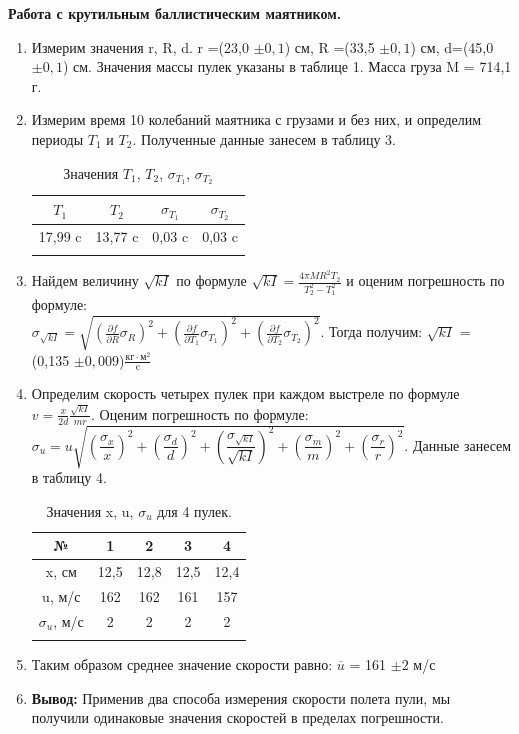 \documentclass[a4paper, 12pt]{article}%
\begin{document}
		\textbf{Работа с крутильным баллистическим маятником.}
		\begin{enumerate}
			
		\item Измерим значения r, R, d. r =(23,0 $\pm 0,1$) см, R =(33,5 $\pm 0,1$) см, d=(45,0 $\pm 0,1$) см. Значения массы пулек указаны в таблице 1. Масса груза M = 714,1 г.
		\item Измерим время 10 колебаний маятника с грузами и без них, и определим периоды $T_1$ и $T_2$. Полученные данные занесем в таблицу 3.
		\begin{longtable}{|c|c|c|c|}
			\hline 
			$T_1$ & $T_2$  & $\sigma_{T_1}$ & $\sigma_{T_2}$ \\
			\hline
			17,99 c&13,77 c& 0,03 c & 0,03 c\\
			\hline
			\caption{Значения $T_1$, $T_2$, $\sigma_{T_1}$, $\sigma_{T_2}$   }
		\end{longtable}
		\item Найдем величину $\sqrt{kI}$ по формуле $\sqrt{kI} = \frac{4 \pi M R^2 T_2}{T_2^2 - T_1^2}$ и оценим погрешность по формуле:\\ $\sigma_{\sqrt{kI}}= \sqrt{(\frac{\partial f}{\partial R}\sigma_R)^2 + (\frac{\partial f}{\partial T_1}\sigma_{T_1})^2 + (\frac{\partial f}{\partial T_2}\sigma_{T_2})^2}$. Тогда получим:
		$\sqrt{kI}$ = (0,135 $\pm0,009$)$\frac {\text {кг}\cdot \text{м}^2}{\text{c}}$
		\item Определим скорость четырех пулек при каждом выстреле по формуле $v = \frac{x}{2d}  \frac{\sqrt{kI}}{mr}$. Оценим погрешность по формуле: $\sigma_u = u\sqrt{\left( \dfrac{\sigma_{x}}{x} \right)^2 + \left( \dfrac{\sigma_{d}}{d} \right)^2 + \left( \dfrac{\sigma_{ \sqrt{kI}}}{\sqrt{kI}} \right)^2 + \left( \dfrac{\sigma_{m}}{m} \right)^2+ \left( \dfrac{\sigma_{r}}{r} \right)^2}$. Данные занесем в таблицу 4.
		
		\begin{longtable}{|c|c|c|c|c|}
			\hline 
			№ & 1 & 2 & 3 & 4 \\
			\hline
			x, см &12,5 &12,8 &12,5  &12,4 \\
			\hline
			u, м/с &162 & 162 & 161 & 157\\
			\hline 
			$\sigma_u$, м/с &2 &2 &2 &2 \\
			\hline 
			\caption{Значения x, u, $\sigma_u$ для 4 пулек. }
		\end{longtable}	
	\item  Таким образом среднее значение скорости равно: $\overline{u}$ = 161 $\pm 2$ м/с
	\item \textbf{Вывод:} Применив два способа измерения скорости полета пули, мы получили одинаковые значения скоростей в пределах погрешности.
	
	
	\end{enumerate}
\end{document}
